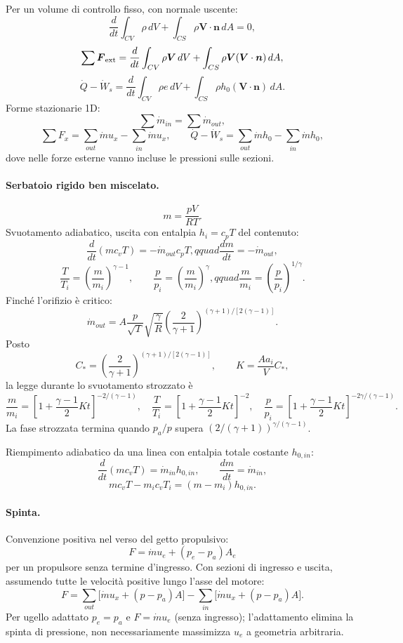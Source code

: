 \documentclass[11pt,a4paper]{article}
\begin{document}
Per un volume di controllo fisso, con normale uscente:
\[
\frac d{dt}\int_{CV}\rho\,dV+\int_{CS}\rho\boldsymbol V\cdot\boldsymbol n\,dA=0,
\]
\[
\sum\boldsymbol F_{\rm ext}=\frac d{dt}\int_{CV}\rho\boldsymbol V\,dV
+\int_{CS}\rho\boldsymbol V(\boldsymbol V\cdot\boldsymbol n)\,dA,
\]
\[
\dot Q-\dot W_s=\frac d{dt}\int_{CV}\rho e\,dV
+\int_{CS}\rho h_0(\boldsymbol V\cdot\boldsymbol n)\,dA.
\]
Forme stazionarie 1D:
\[
\sum\dot m_{in}=\sum\dot m_{out},
\]
\[
\sum F_x=\sum_{out}\dot m u_x-\sum_{in}\dot m u_x,
\qquad
\dot Q-\dot W_s=\sum_{out}\dot m h_0-\sum_{in}\dot m h_0,
\]
dove nelle forze esterne vanno incluse le pressioni sulle sezioni.

\paragraph*{Serbatoio rigido ben miscelato.}
\[
m=\frac{pV}{RT}.
\]
Svuotamento adiabatico, uscita con entalpia $h_i=c_pT$ del contenuto:
\[
\frac d{dt}(mc_vT)=-\dot m_{out}c_pT,qquad \frac{dm}{dt}=-\dot m_{out},
\]
\[
\frac T{T_i}=\left(\frac m{m_i}\right)^{\gamma-1},\qquad
\frac p{p_i}=\left(\frac m{m_i}\right)^\gamma,qquad
\frac m{m_i}=\left(\frac p{p_i}\right)^{1/\gamma}.
\]
Finché l'orifizio è critico:
\[
\dot m_{out}=A\frac p{\sqrt T}\sqrt{\frac\gamma R}
\left(\frac{2}{\gamma+1}\right)^{(\gamma+1)/[2(\gamma-1)]}.
\]
Posto
\[
C_*=\left(\frac{2}{\gamma+1}\right)^{(\gamma+1)/[2(\gamma-1)]},
\qquad K=\frac{Aa_i}{V}C_*,
\]
la legge durante lo svuotamento strozzato è
\[
\frac m{m_i}=\left[1+\frac{\gamma-1}{2}Kt\right]^{-2/(\gamma-1)},
\quad
\frac T{T_i}=\left[1+\frac{\gamma-1}{2}Kt\right]^{-2},
\quad
\frac p{p_i}=\left[1+\frac{\gamma-1}{2}Kt\right]^{-2\gamma/(\gamma-1)}.
\]
La fase strozzata termina quando $p_a/p$ supera
$(2/(\gamma+1))^{\gamma/(\gamma-1)}$.

Riempimento adiabatico da una linea con entalpia totale costante $h_{0,in}$:
\[
\frac d{dt}(mc_vT)=\dot m_{in}h_{0,in},\qquad \frac{dm}{dt}=\dot m_{in},
\]
\[
mc_vT-m_ic_vT_i=(m-m_i)h_{0,in}.
\]

\paragraph*{Spinta.}
Convenzione positiva nel verso del getto propulsivo:
\[
F=\dot m u_e+(p_e-p_a)A_e
\]
per un propulsore senza termine d'ingresso. Con sezioni di ingresso e uscita,
assumendo tutte le velocità positive lungo l'asse del motore:
\[
F=\sum_{out}\bigl[\dot m u_x+(p-p_a)A\bigr]
-\sum_{in}\bigl[\dot m u_x+(p-p_a)A\bigr].
\]
Per ugello adattato $p_e=p_a$ e $F=\dot m u_e$ (senza ingresso); l'adattamento elimina
la spinta di pressione, non necessariamente massimizza $u_e$ a geometria arbitraria.
\end{document}
